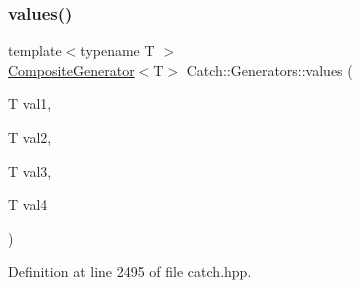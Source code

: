 \subsubsection{\texorpdfstring{values()}{values()}\hspace{0.1cm}{\footnotesize\ttfamily [3/3]}}
{\footnotesize\ttfamily template$<$typename T $>$ \\
\hyperlink{class_catch_1_1_composite_generator}{Composite\+Generator}$<$T$>$ Catch\+::\+Generators\+::values (\begin{DoxyParamCaption}\item[{T}]{val1,  }\item[{T}]{val2,  }\item[{T}]{val3,  }\item[{T}]{val4 }\end{DoxyParamCaption})}



Definition at line 2495 of file catch.\+hpp.

